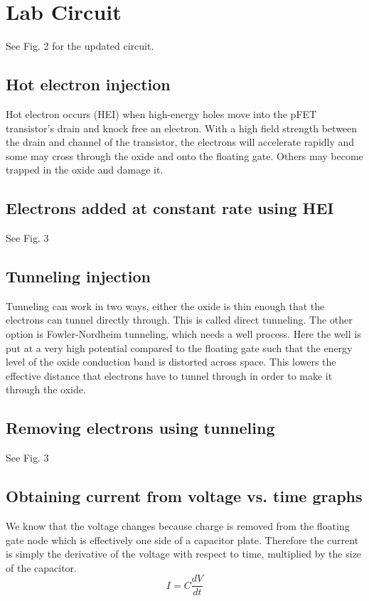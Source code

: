 \section{Lab Circuit}
See Fig. 2 for the updated circuit.
\subsection{Hot electron injection}
Hot electron occurs (HEI) when high-energy holes move into the pFET transistor's drain and knock free an electron. With a high
field strength between the drain and channel of the transistor, the electrons will accelerate rapidly and some may cross through the
oxide and onto the floating gate. Others may become trapped in the oxide and damage it.

\subsection{Electrons added at constant rate using HEI}
See Fig. 3

\subsection{Tunneling injection}
Tunneling can work in two ways, either the oxide is thin enough that the electrons can tunnel directly through. This is called direct tunneling.
The other option is Fowler-Nordheim tunneling, which needs a well process. Here the well is put at a very high potential compared to the floating
gate such that the energy level of the oxide conduction band is distorted across space. This lowers the effective distance that electrons have to
tunnel through in order to make it through the oxide.

\subsection{Removing electrons using tunneling}
See Fig. 3

\subsection{Obtaining current from voltage vs. time graphs}
We know that the voltage changes because charge is removed from the floating gate node which is effectively one side of a capacitor plate. 
Therefore the current is simply the derivative of the voltage with respect to time, multiplied by the size of the capacitor.
\begin{equation*}
    I = C\frac{dV}{dt}
\end{equation*}

